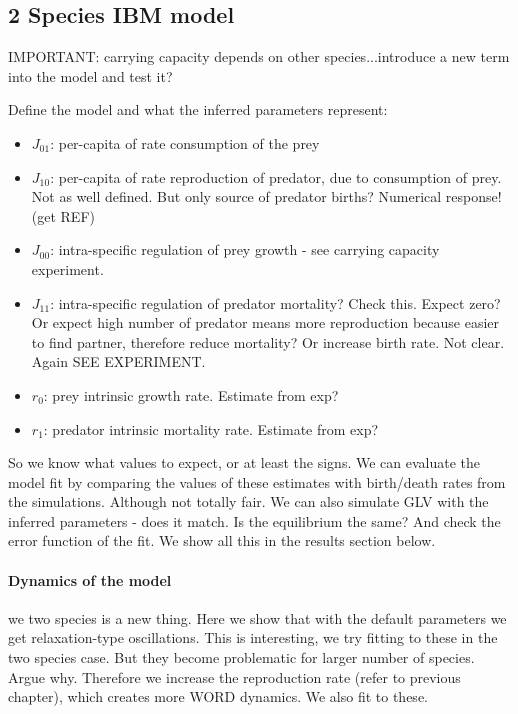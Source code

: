 \subsection{2 Species IBM model}

IMPORTANT: carrying capacity depends on other species...introduce a new term into the model and test it?

Define the model and what the inferred parameters represent:

\begin{itemize}
	\item $J_{01}$: per-capita of rate consumption of the prey
	\item $J_{10}$: per-capita of rate reproduction of predator, due to consumption of prey. Not as well defined. But only source of predator births? Numerical response! (get REF)
	
	\item $J_{00}$: intra-specific regulation of prey growth - see carrying capacity experiment.
	
	\item $J_{11}$: intra-specific regulation of predator mortality? Check this. Expect zero? Or expect high number of predator means more reproduction because easier to find partner, therefore reduce mortality? Or increase birth rate. Not clear. Again SEE EXPERIMENT. 
	
	\item $r_0$: prey intrinsic growth rate. Estimate from exp?
	
	\item $r_1$: predator intrinsic mortality rate. Estimate from exp?
\end{itemize}

So we know what values to expect, or at least the signs. We can evaluate the model fit by comparing the values of these estimates with birth/death rates from the simulations. Although not totally fair. We can also simulate GLV with the inferred parameters - does it match. Is the equilibrium the same? And check the error function of the fit. We show all this in the results section below.

\paragraph*{Dynamics of the model} we two species is a new thing. Here we show that with the default parameters we get relaxation-type oscillations. This is interesting, we try fitting to these in the two species case. But they become problematic for larger number of species. Argue why. Therefore we increase the reproduction rate (refer to previous chapter), which creates more WORD dynamics. We also fit to these. 

